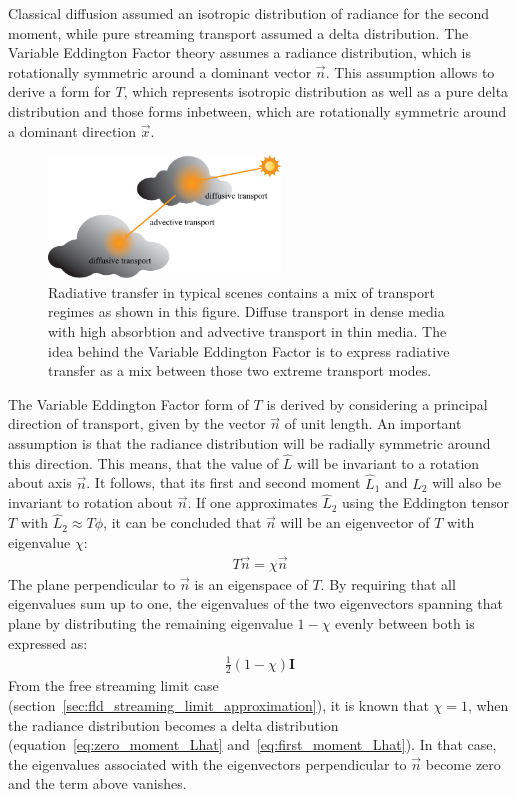Classical diffusion assumed an isotropic distribution of radiance for the second moment, while pure streaming transport assumed a delta distribution. The Variable Eddington Factor theory assumes a radiance distribution, which is rotationally symmetric around a dominant vector $\vec{n}$. This assumption allows to derive a form for $T$, which represents isotropic distribution as well as a pure delta distribution and those forms inbetween, which are rotationally symmetric around a dominant direction $\vec{x}$.
\begin{figure}[h]
\centering
\includegraphics[width=0.55\textwidth]{06_fld/figures/fig_transport_regimes_scene.pdf}
\caption{Radiative transfer in typical scenes contains a mix of transport regimes as shown in this figure. Diffuse transport in dense media with high absorbtion and advective transport in thin media. The idea behind the Variable Eddington Factor is to express radiative transfer as a mix between those two extreme transport modes.}
\label{fig:fld_vef_advection_diffusion2}
\end{figure}

The Variable Eddington Factor form of $T$ is derived by considering a principal direction of transport, given by the vector $\vec{n}$ of unit length. An important assumption is that the radiance distribution will be radially symmetric around this direction. This means, that the value of $\hat{L}$ will be invariant to a rotation about axis $\vec{n}$. It follows, that its first and second moment $\hat{L}_1$ and $\hat{L}_2$ will also be invariant to rotation about $\vec{n}$. If one approximates $\hat{L}_2$ using the Eddington tensor $T$ with $\hat{L}_2\approx T\phi$, it can be concluded that $\vec{n}$ will be an eigenvector of $T$ with eigenvalue $\chi$:
\begin{align*}
T\vec{n} = \chi\vec{n}
\end{align*}
The plane perpendicular to $\vec{n}$ is an eigenspace of $T$. By requiring that all eigenvalues sum up to one, the eigenvalues of the two eigenvectors spanning that plane by distributing the remaining eigenvalue $1-\chi$ evenly between both is expressed as:
\begin{align}
\frac{1}{2}\left(1-\chi\right)\mathbf{I}
\label{eq:iso_var_T_isoterm}
\end{align}
From the free streaming limit case (section~\ref{sec:fld_streaming_limit_approximation}), it is known that $\chi=1$, when the radiance distribution becomes a delta distribution (equation~\ref{eq:zero_moment_Lhat} and~\ref{eq:first_moment_Lhat}). In that case, the eigenvalues associated with the eigenvectors perpendicular to $\vec{n}$ become zero and the term above vanishes.

